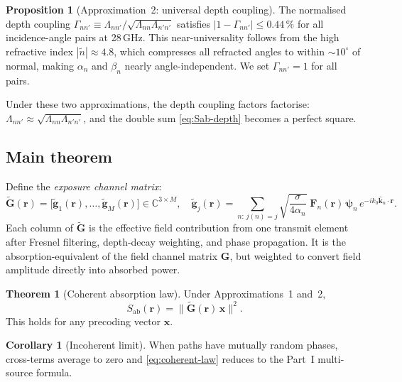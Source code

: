 \documentclass[11pt,a4paper]{article}
\theoremstyle{definition}
\newtheorem{theorem}{Theorem}[section]
\newtheorem{proposition}[proposition]{Proposition}
\newtheorem{corollary}[corollary]{Corollary}
\newcommand{\Sab}{S_{\mathrm{ab}}}
\newcommand{\ntilde}{\tilde{n}}
\begin{document}
\begin{proposition}[Approximation~2: universal depth coupling]
The normalised depth coupling
$\Gamma_{nn'}\equiv\Lambda_{nn'}/\sqrt{\Lambda_{nn}\Lambda_{n'n'}}$
satisfies $|1-\Gamma_{nn'}|\le 0.44\,\%$ for all incidence-angle pairs
at 28\,GHz.  This near-universality follows from the high refractive
index $|\ntilde|\approx 4.8$, which compresses all refracted angles to
within ${\sim}10^\circ$ of normal, making $\alpha_n$ and $\beta_n$
nearly angle-independent.  We set $\Gamma_{nn'}=1$ for all pairs.
\end{proposition}

Under these two approximations, the depth coupling factors factorise:
$\Lambda_{nn'}\approx\sqrt{\Lambda_{nn}\Lambda_{n'n'}}$, and the double
sum \cref{eq:Sab-depth} becomes a perfect square.

\subsection{Main theorem}

Define the \emph{exposure channel matrix}:
\begin{equation}\label{eq:Gtilde-def}
  \tilde{\mathbf{G}}(\mathbf{r})
  = \bigl[\tilde{\mathbf{g}}_1(\mathbf{r}),\ldots,\tilde{\mathbf{g}}_M(\mathbf{r})\bigr]
  \in\mathbb{C}^{3\times M},
  \quad
  \tilde{\mathbf{g}}_j(\mathbf{r}) = \sum_{n:\,j(n)=j}
    \sqrt{\frac{\sigma}{4\alpha_n}}\;
    \mathbf{F}_n(\mathbf{r})\,\boldsymbol{\psi}_n\,
    e^{-ik_0\hat{\mathbf{k}}_n\cdot\mathbf{r}}.
\end{equation}
Each column of $\tilde{\mathbf{G}}$ is the effective field contribution
from one transmit element after Fresnel filtering, depth-decay weighting,
and phase propagation.  It is the absorption-equivalent of the field
channel matrix $\mathbf{G}$, but weighted to convert field amplitude
directly into absorbed power.

\begin{theorem}[Coherent absorption law]\label{thm:coherent-law}
Under Approximations~1 and~2,
\begin{equation}\label{eq:coherent-law}
  \boxed{\Sab(\mathbf{r}) = \|\tilde{\mathbf{G}}(\mathbf{r})\,\mathbf{x}\|^2.}
\end{equation}
This holds for any precoding vector $\mathbf{x}$.
\end{theorem}

\begin{corollary}[Incoherent limit]
When paths have mutually random phases, cross-terms average to zero and
\cref{eq:coherent-law} reduces to the Part~I multi-source formula.
\end{corollary}
\end{document}
